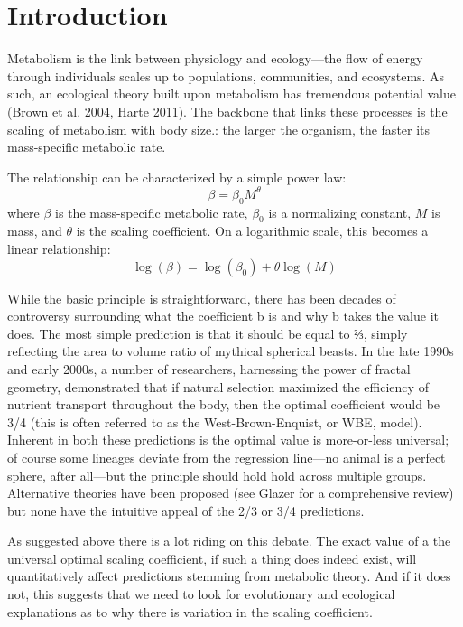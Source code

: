 \documentclass[a4paper,11pt]{article}
\begin{document}
\section*{Introduction}

Metabolism is the link between physiology and ecology---the flow of energy through individuals scales up to populations, communities, and ecosystems. As such, an ecological theory built upon metabolism has tremendous potential value (Brown et al. 2004, Harte 2011). The backbone that links these processes is the scaling of metabolism with body size.: the larger the organism, the faster its mass-specific metabolic rate. 

The relationship can be characterized by a simple power law:
\begin{equation}
  \beta = \beta_0 M^{\theta}
\end{equation}
where $\beta$ is the mass-specific metabolic rate, $\beta_0$ is a normalizing constant, $M$ is mass, and $\theta$ is the scaling coefficient. On a logarithmic scale, this becomes a linear relationship:
\begin{equation}
  \log(\beta) = \log(\beta_0) + \theta \log(M)
\end{equation}
 
While the basic principle is straightforward, there has been decades of controversy surrounding what the coefficient b is and why b takes the value it does. The most simple prediction is that it should be equal to ⅔, simply reflecting the area to volume ratio of mythical spherical beasts. In the late 1990s and early 2000s, a number of researchers, harnessing the power of fractal geometry, demonstrated that if natural selection maximized the efficiency of nutrient transport throughout the body, then the optimal coefficient would be 3/4 (this is often referred to as the West-Brown-Enquist, or WBE, model). Inherent in both these predictions is the optimal value is more-or-less universal; of course some lineages deviate from the regression line—no animal is a perfect sphere, after all—but the principle should hold hold across multiple groups. Alternative theories have been proposed (see Glazer for a comprehensive review) but none have the intuitive appeal of the 2/3 or 3/4 predictions.

As suggested above there is a lot riding on this debate. The exact value of a the universal optimal scaling coefficient, if such a thing does indeed exist, will quantitatively affect predictions stemming from metabolic theory. And if it does not, this suggests that we need to look for evolutionary and ecological explanations as to why there is variation in the scaling coefficient.
\end{document}
